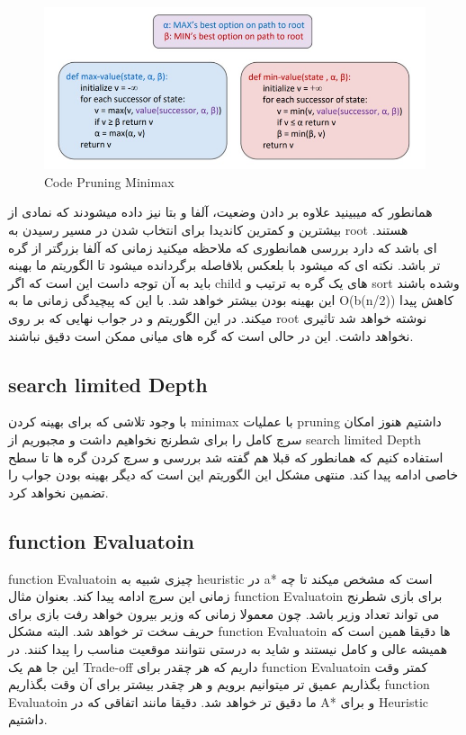 \begin{figure}[h!]
    \centering
    \includegraphics[width=0.8\linewidth]{images/pruning02.jpg}
    \caption{Code Pruning Minimax}
\end{figure}

همانطور که میبینید علاوه بر دادن وضعیت، آلفا و بتا نیز داده میشودند که نمادی از بیشترین و کمترین کاندیدا برای انتخاب شدن در مسیر رسیدن به root هستند.  همانطوری که ملاحظه میکنید زمانی که آلفا بزرگتر از گره‎ ای باشد که دارد بررسی میشود با بلعکس بلافاصله برگردانده میشود تا الگوریتم ما بهینه‎ تر باشد.
 نکته ای که باید به آن توجه داست این است که اگر child های یک گره به ترتیب و sort وشده باشند این بهینه بودن بیشتر خواهد شد. با این که پیچیدگی زمانی ما به O(b(n/2)) کاهش پیدا میکند. 
در این الگوریتم و در جواب نهایی که بر روی root نوشته خواهد شد تاثیری نخواهد داشت. این در حالی است که گره های میانی ممکن است دقیق نباشند.


\subsection{search limited Depth}
با وجود تلاشی که برای بهینه کردن minimax با عملیات pruning داشتیم هنوز امکان سرچ کامل را برای شطرنج نخواهیم داشت و مجبوریم از search limited Depth استفاده کنیم که همانطور که قبلا هم گفته شد بررسی و سرچ کردن گره ها تا سطح خاصی ادامه پیدا کند. منتهی مشکل این الگوریتم این است که دیگر بهینه بودن جواب را تضمین نخواهد کرد.

\subsection{function Evaluatoin}
function Evaluatoin چیزی شبیه به heuristic در a* است که مشخص میکند تا چه زمانی این سرچ ادامه پیدا کند. بعنوان مثال  function Evaluatoin  برای بازی شطرنج می تواند تعداد وزیر باشد. چون معمولا زمانی که وزیر بیرون خواهد رفت بازی برای حریف سخت تر خواهد شد. البته مشکل function Evaluatoin ها دقیقا همین است که همیشه عالی و کامل نیستند و شاید به درستی نتوانند موقعیت مناسب را پیدا کنند. در این جا هم یک Trade-off داریم که هر چقدر برای function Evaluatoin کمتر وقت بگذاریم عمیق تر میتوانیم برویم و هر چقدر بیشتر برای آن وقت بگذاریم function Evaluatoin ما دقیق تر خواهد شد. دقیقا مانند اتفاقی که در A* و برای Heuristic داشتیم.

